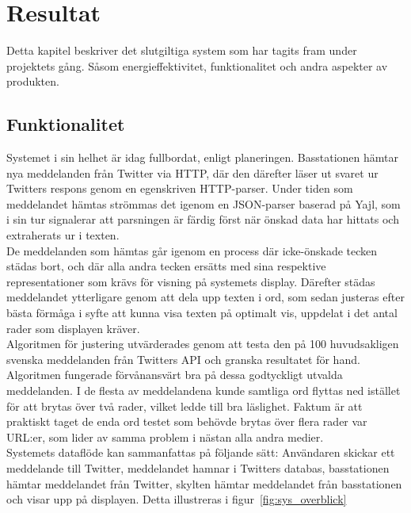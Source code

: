 \documentclass[a4paper,11pt]{article}
\begin{document}
\section{Resultat}

Detta kapitel beskriver det slutgiltiga system som har tagits fram under projektets gång. Såsom energieffektivitet, funktionalitet och andra aspekter av produkten.

\subsection{Funktionalitet}

Systemet i sin helhet är idag fullbordat, enligt planeringen. Basstationen hämtar nya meddelanden från Twitter via HTTP, där den därefter läser ut svaret ur Twitters respons genom en egenskriven HTTP-parser. Under tiden som meddelandet hämtas strömmas det igenom en JSON-parser baserad på Yajl, som i sin tur signalerar att parsningen är färdig först när önskad data har hittats och extraherats ur i texten.\\

De meddelanden som hämtas går igenom en process där icke-önskade tecken städas bort, och där alla andra tecken ersätts med sina respektive representationer som krävs för visning på systemets display. Därefter städas meddelandet ytterligare genom att dela upp texten i ord, som sedan justeras efter bästa förmåga i syfte att kunna visa texten på optimalt vis, uppdelat i det antal rader som displayen kräver.\\

Algoritmen för justering utvärderades genom att testa den på 100 huvudsakligen svenska meddelanden från Twitters API och granska resultatet för hand. Algoritmen fungerade förvånansvärt bra på dessa godtyckligt utvalda meddelanden. I de flesta av meddelandena kunde samtliga ord flyttas ned istället för att brytas över två rader, vilket ledde till bra läslighet. Faktum är att praktiskt taget de enda ord testet som behövde brytas över flera rader var URL:er, som lider av samma problem i nästan alla andra medier. \\

Systemets dataflöde kan sammanfattas på följande sätt: Användaren skickar ett meddelande till Twitter, meddelandet hamnar i Twitters databas, basstationen hämtar meddelandet från Twitter, skylten hämtar meddelandet från basstationen och visar upp på displayen. Detta illustreras i figur~\ref{fig:sys_overblick}
\end{document}
